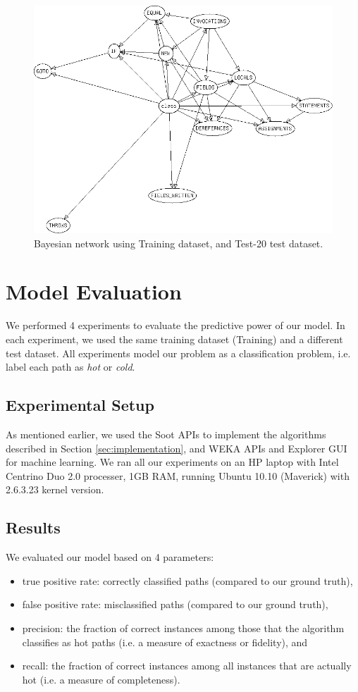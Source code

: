 \documentclass[10pt,twocolumn,letterpaper]{article}
\begin{document}
\begin{figure}[t!]
\centering
\includegraphics[width=\textwidth]{imgs/bayes.png}
\caption{Bayesian network using Training dataset, and Test-20 test dataset.}
\label{fig:bayes}
\end{figure}

\section{Model Evaluation}
\label{sec:results}
We performed 4 experiments to evaluate the predictive power of our model. In each experiment, we used the same training dataset (Training) and a different test
dataset. All experiments model our problem as a classification problem, i.e. label each path as \textit{hot} or \textit{cold}.

\subsection{Experimental Setup}
As mentioned earlier, we used the Soot \cite{vallee1999soot} APIs to implement the algorithms described in Section \ref{sec:implementation}, and WEKA
\cite{hall2009weka} APIs and Explorer GUI for machine learning. We ran all our experiments on an HP laptop with Intel Centrino Duo 2.0 processer, 1GB RAM,
running Ubuntu 10.10 (Maverick) with 2.6.3.23 kernel version.

\subsection{Results}
We evaluated our model based on 4 parameters:
\begin{itemize}
  \item true positive rate: correctly classified paths (compared to our ground truth),
  \item false positive rate: misclassified paths (compared to our ground truth),
  \item precision: the fraction of correct instances among those that the algorithm classifies as hot paths (i.e. a measure of exactness or fidelity), and
  \item recall: the fraction of correct instances among all instances that are actually hot (i.e. a measure of completeness).
\end{itemize}
\end{document}
